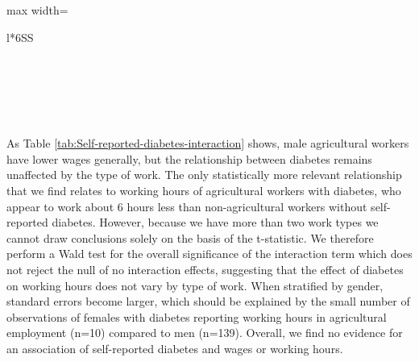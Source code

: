 \documentclass[12pt,english,british]{article}
\newcommand{\sym}[1]{\ensuremath{^{#1}}} %
\begin{document}
\begin{table}[h]
\begin{center}
\begin{adjustbox}{max width=\textwidth}
{\begin{tabular}{l*{6}{SS}}
\bottomrule
{}\\
\\
\\
\\
\\
\multicolumn{7}{l}{\footnotesize \sym{*} \(p<0.10\), \sym{**} \(p<0.05\), \sym{***} \(p<0.01\)}\\
\end{tabular}
}
\end{adjustbox}
\end{center}
\caption{\label{tab:Self-reported-diabetes-interaction}\textbf{Relationship of self-reported diabetes by worktype and wages and working hours (fixed effects)}}
\end{table}  

\FloatBarrier
  
As Table \ref{tab:Self-reported-diabetes-interaction} shows, male
agricultural workers have lower wages generally, but the relationship
between diabetes remains unaffected by the type of work. The only
statistically more relevant relationship that we find relates to working
hours of agricultural workers with diabetes, who appear to work about
6 hours less than non-agricultural workers without self-reported diabetes.
However, because we have more than two work types we cannot draw conclusions
solely on the basis of the t-statistic. We therefore perform a Wald
test for the overall significance of the interaction term which does
not reject the null of no interaction effects, suggesting that the
effect of diabetes on working hours does not vary by type of work.
When stratified by gender, standard errors become larger, which should
be explained by the small number of observations of females with diabetes
reporting working hours in agricultural employment (n=10) compared
to men (n=139). Overall, we find no evidence for an association of
self-reported diabetes and wages or working hours.
\end{document}
